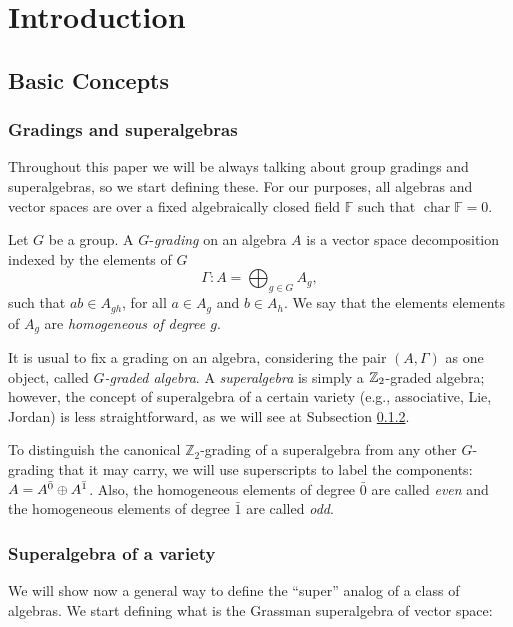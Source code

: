 \chapter*{Introduction}

\section{Basic Concepts}

\subsection{Gradings and superalgebras} Throughout this paper we will be always talking about group gradings and superalgebras, so we start defining these. For our purposes, all algebras and vector spaces are over a fixed algebraically closed field $\mathbb{F}$ such that $\operatorname{char} \mathbb{F}=0$.

\begin{defi}\label{def:grading}
	Let $G$ be a group. A $G$-\emph{grading} on an algebra $A$ is a vector space decomposition indexed by the elements of $G$
	\[\Gamma : A= \bigoplus_{g \in G} A_g,\]
	such that $ab \in A_{gh}$, for all $a \in A_{g}$ and $b \in A_{h}$. We say that the elements elements of $A_g$ are \emph{homogeneous of degree $g$}.
\end{defi}

It is usual to fix a grading on an algebra, considering the pair $(A, \Gamma)$ as one object, called \emph{$G$-graded algebra}. A \emph{superalgebra} is simply a $\mathbb{Z}_{2}$-graded algebra; however, the concept of superalgebra of a certain variety (e.g., associative, Lie, Jordan) is less straightforward, as we will see at Subsection \ref{subsec:super-analog}.

To distinguish the canonical $\mathbb{Z}_2$-grading of a superalgebra from any other $G$-grading that it may carry, we will use superscripts to label the components: $A=A^{\bar0} \oplus A^{\bar1}$. Also, the homogeneous elements of degree $\bar0$ are called \emph{even} and the homogeneous elements of degree $\bar1$ are called \emph{odd}.

\subsection{Superalgebra of a variety}\label{subsec:super-analog}

We will show now a general way to define the ``super'' analog of a class of algebras. We start defining what is the Grassman superalgebra of vector space:

